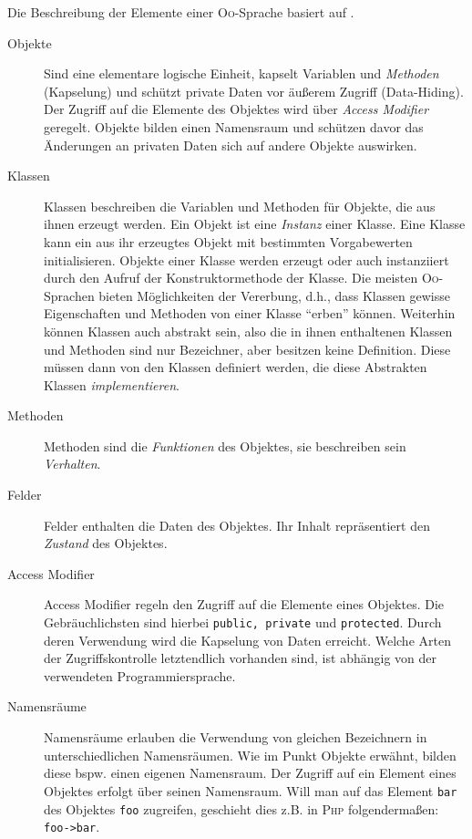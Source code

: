 Die Beschreibung der Elemente einer \textsc{Oo}-Sprache basiert auf \cite{oopSkript2012}.

\begin{description}
    \item[Objekte] 
        Sind eine elementare logische Einheit, kapselt Variablen und \emph{Methoden} (Kapselung) und schützt private Daten vor äußerem Zugriff (Data-Hiding). Der Zugriff auf die Elemente des Objektes wird über \emph{Access Modifier} geregelt. Objekte bilden einen Namensraum und schützen davor das Änderungen an privaten Daten sich auf andere Objekte auswirken.
    \item[Klassen] 
        Klassen beschreiben die Variablen und Methoden für Objekte, die aus ihnen erzeugt werden. Ein Objekt ist eine \emph{Instanz} einer Klasse. Eine Klasse kann ein aus ihr erzeugtes Objekt mit bestimmten Vorgabewerten initialisieren. Objekte einer Klasse werden erzeugt oder auch instanziiert durch den Aufruf der Konstruktormethode der Klasse.
        Die meisten \textsc{Oo}-Sprachen bieten Möglichkeiten der Vererbung, d.h., dass Klassen gewisse Eigenschaften und Methoden von einer Klasse \enquote{erben} können. Weiterhin können Klassen auch abstrakt sein, also die in ihnen enthaltenen Klassen und Methoden sind nur Bezeichner, aber besitzen keine Definition. Diese müssen dann von den Klassen definiert werden, die diese Abstrakten Klassen \emph{implementieren}.
    \item[Methoden]
        Methoden sind die \emph{Funktionen} des Objektes, sie beschreiben sein \emph{Verhalten}.
    \item[Felder]
        Felder enthalten die Daten des Objektes. Ihr Inhalt repräsentiert den \emph{Zustand} des Objektes.
    \item[Access Modifier]    
        Access Modifier regeln den Zugriff auf die Elemente eines Objektes. Die Gebräuchlichsten sind hierbei \texttt{public, private} und \texttt{protected}. Durch deren Verwendung wird die Kapselung von Daten erreicht. Welche Arten der Zugriffskontrolle letztendlich vorhanden sind, ist abhängig von der verwendeten Programmiersprache.
    \item[Namensräume]
        Namensräume erlauben die Verwendung von gleichen Bezeichnern in unterschiedlichen Namensräumen. Wie im Punkt Objekte erwähnt, bilden diese bspw. einen eigenen Namensraum. Der Zugriff auf ein Element eines Objektes erfolgt über seinen Namensraum. Will man auf das Element \texttt{bar} des Objektes \texttt{foo} zugreifen, geschieht dies z.B. in \textsc{Php} folgendermaßen: \texttt{foo->bar}.
\end{description}

